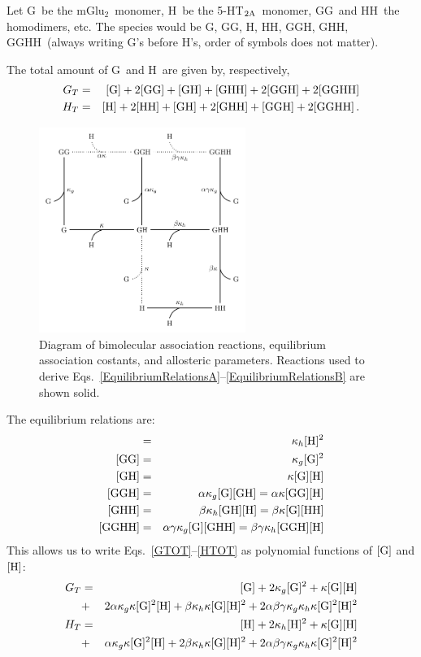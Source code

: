 \documentclass[12pt]{article}
\def\Eqs#1#2{Eqs.~\ref{#1}--\ref{#2}}
\def\MGluTwo{mGlu$_2$}
\def\FiveHTTwoA{5-HT$_{\rm 2A}$}
\def\G{{\rm G}}
\def\H{{\rm H}}
\def\GG{{\rm GG}}
\def\GH{{\rm GH}}
\def\HH{{\rm HH}}
\def\GGH{{\rm GGH}}
\def\GHH{{\rm GHH}}
\def\GGHH{{\rm GGHH}}
\def\g{[\G]}
\def\h{[\H]}
\def\gg{[\GG]}
\def\gh{[\GH]}
\def\hh{[\HH]}
\def\ggh{[\GGH]}
\def\ghh{[\GHH]}
\def\gghh{[\GGHH]}
\def\gtot{G_T}
\def\htot{H_T}
\begin{document}
Let \G\ be the \MGluTwo\ monomer, \H\ be the \FiveHTTwoA\ monomer, \GG\ and \HH\ the homodimers, etc. The species would be \G, \GG, \H, \HH, \GGH, \GHH, \GGHH\ (always writing \G's before \H's, order of symbols does not matter).

The total amount of \G\ and \H\ are given by, respectively, 
\begin{eqnarray}
\gtot & =& \g + 2 \gg + \gh + \ghh + 2\ggh + 2\gghh \label{GTOT}\\
\htot &=& \h + 2 \hh + \gh + 2 \ghh  + \ggh  + 2\gghh  \label{HTOT} \, . 
\end{eqnarray}

\begin{figure}
    \centering
 \includegraphics[width=0.6\textwidth]{FigGHDiagram.pdf}  
    \caption{Diagram of bimolecular association reactions, equilibrium association costants, and allosteric parameters. Reactions used to derive \Eqs{EquilibriumRelationsA}{EquilibriumRelationsB} are shown solid.}
    \label{fig:diagram}
\end{figure}

The equilibrium relations are:
\begin{eqnarray}
\hh & = & \kappa_h \h^2 \label{EquilibriumRelationsA}\\
\gg & = & \kappa_g \g^2 \\
\gh & = & \kappa \g \h  \\
\ggh & = & \alpha \kappa_g \g \gh = \alpha \kappa \gg \h  \label{EquilibriumRelationsGGH}   \\
\ghh & = & \beta \kappa_h \gh \h  = \beta \kappa \g \hh  \\
\gghh & = & \alpha \gamma \kappa_g \g \ghh  = \beta \gamma \kappa_h  \ggh \h   \label{EquilibriumRelationsB}
\end{eqnarray}
This allows us to write \Eqs{GTOT}{HTOT} as polynomial functions of $\g$ and $\h$:
\begin{eqnarray}
\gtot & = & \g + 2 \kappa_g \g^2 + \kappa \g \h \\
&+& 2 \alpha \kappa_g \kappa \g^2 \h  + \beta \kappa_h \kappa \g \h^2  + 2 \alpha \beta \gamma \kappa_g \kappa_h \kappa \g^2\h^2 \label{GTOTAgain}\\
\htot &=& \h + 2 \kappa_h \h^2  +  \kappa \g \h \\
&+&  \alpha \kappa_g \kappa \g^2 \h + 2 
\beta \kappa_h \kappa \g \h^2     + 2 \alpha \beta \gamma \kappa_g \kappa_h \kappa \g^2\h^2 \label{HTOTAgain}
\end{eqnarray}
\end{document}

